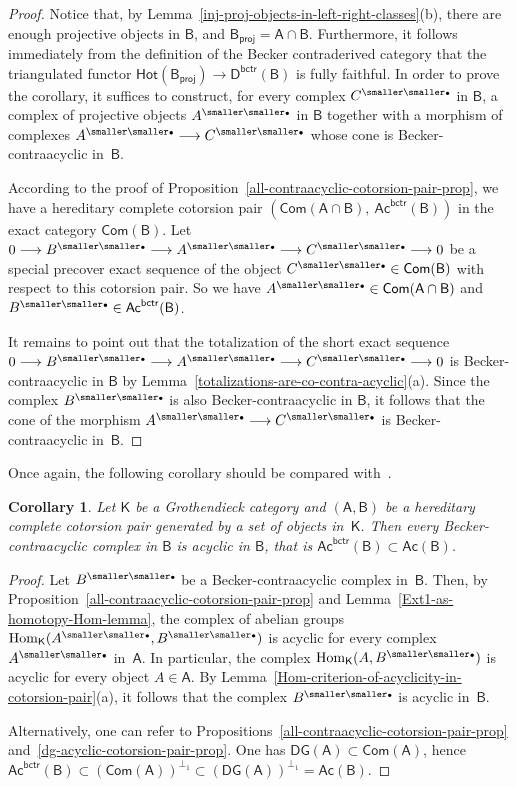 \documentclass[12pt,a4paper]{amsart}
\newcommand{\+}{\nobreakdash-}
\renewcommand{\:}{\colon}
\newcommand{\rarrow}{\longrightarrow}
\newcommand{\bu}{{\text{\smaller\smaller$\scriptstyle\bullet$}}}
\DeclareMathOperator{\Hom}{Hom}
\newcommand{\sA}{\mathsf A}
\newcommand{\sB}{\mathsf B}
\newcommand{\sD}{\mathsf D}
\newcommand{\sK}{\mathsf K}
\newcommand{\Hot}{\mathsf{Hot}}
\newcommand{\Com}{\mathsf{Com}}
\newcommand{\Ac}{\mathsf{Ac}}
\newcommand{\DG}{\mathsf{DG}}
\newcommand{\proj}{\mathsf{proj}}
\newcommand{\bctr}{\mathsf{bctr}}
\theoremstyle{plain}
\newtheorem{cor}[thm]{Corollary}
\theoremstyle{definition}
\begin{document}
\begin{proof}
 Notice that, by
Lemma~\ref{inj-proj-objects-in-left-right-classes}(b), there are enough
projective objects in $\sB$, and $\sB_\proj=\sA\cap\sB$.
 Furthermore, it follows immediately from the definition of
the Becker contraderived category that the triangulated functor
$\Hot(\sB_\proj)\rarrow\sD^\bctr(\sB)$ is fully faithful.
 In order to prove the corollary, it suffices to construct, for every
complex $C^\bu$ in $\sB$, a complex of projective objects $A^\bu$ in
$\sB$ together with a morphism of complexes $A^\bu\rarrow C^\bu$
whose cone is Becker-contraacyclic in~$\sB$.

 According to the proof of
Proposition~\ref{all-contraacyclic-cotorsion-pair-prop}, we have
a hereditary complete cotorsion pair
$(\Com(\sA\cap\sB),\>\Ac^\bctr(\sB))$ in the exact category $\Com(\sB)$.
 Let $0\rarrow B^\bu\rarrow A^\bu\rarrow C^\bu\rarrow0$ be a special
precover exact sequence of the object $C^\bu\in\Com(\sB)$ with
respect to this cotorsion pair.
 So we have $A^\bu\in\Com(\sA\cap\sB)$ and $B^\bu\in\Ac^\bctr(\sB)$.

 It remains to point out that the totalization of the short exact
sequence $0\rarrow B^\bu\rarrow A^\bu\rarrow C^\bu\rarrow0$ is
Becker-contraacyclic in $\sB$ by
Lemma~\ref{totalizations-are-co-contra-acyclic}(a).
 Since the complex $B^\bu$ is also Becker-contraacyclic in $\sB$,
it follows that the cone of the morphism $A^\bu\rarrow C^\bu$ is
Becker-contraacyclic in~$\sB$.
\end{proof}

 Once again, the following corollary should be compared
with~\cite[Lemma~B.7.3(b) and Remark~B.7.4]{Pcosh}.

\begin{cor} \label{contraacyclic-in-B-are-acyclic-in-B}
 Let\/ $\sK$ be a Grothendieck category and $(\sA,\sB)$ be a hereditary
complete cotorsion pair generated by a set of objects in\/~$\sK$.
 Then every Becker-contraacyclic complex in\/ $\sB$ is acyclic in\/
$\sB$, that is\/ $\Ac^\bctr(\sB)\subset\Ac(\sB)$.
\end{cor}

\begin{proof}
 Let $B^\bu$ be a Becker-contraacyclic complex in~$\sB$.
 Then, by Proposition~\ref{all-contraacyclic-cotorsion-pair-prop} and
Lemma~\ref{Ext1-as-homotopy-Hom-lemma}, the complex of abelian groups
$\Hom_\sK(A^\bu,B^\bu)$ is acyclic for every complex $A^\bu$ in~$\sA$.
 In particular, the complex $\Hom_\sK(A,B^\bu)$ is acyclic for every
object $A\in\sA$.
 By Lemma~\ref{Hom-criterion-of-acyclicity-in-cotorsion-pair}(a), it
follows that the complex $B^\bu$ is acyclic in~$\sB$.

 Alternatively, one can refer to
Propositions~\ref{all-contraacyclic-cotorsion-pair-prop}
and~\ref{dg-acyclic-cotorsion-pair-prop}.
 One has $\DG(\sA)\subset\Com(\sA)$, hence $\Ac^\bctr(\sB)\subset
(\Com(\sA))^{\perp_1}\subset(\DG(\sA))^{\perp_1}=\Ac(\sB)$.
\end{proof}
\end{document}
